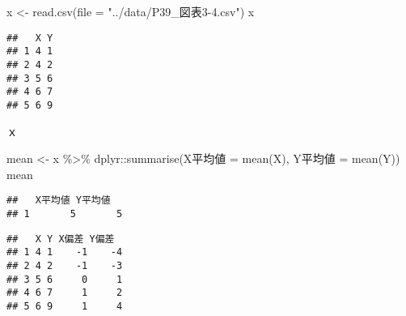 \documentclass[
  12pt,
]{book}
\newenvironment{Shaded}{\begin{snugshade}}{\end{snugshade}}
\newcommand{\AttributeTok}[1]{\textcolor[rgb]{0.77,0.63,0.00}{#1}}
\newcommand{\FunctionTok}[1]{\textcolor[rgb]{0.00,0.00,0.00}{#1}}
\newcommand{\NormalTok}[1]{#1}
\newcommand{\OtherTok}[1]{\textcolor[rgb]{0.56,0.35,0.01}{#1}}
\newcommand{\SpecialCharTok}[1]{\textcolor[rgb]{0.00,0.00,0.00}{#1}}
\newcommand{\StringTok}[1]{\textcolor[rgb]{0.31,0.60,0.02}{#1}}
\begin{document}
\begin{Shaded}
\begin{Highlighting}[]
\NormalTok{x }\OtherTok{\textless{}{-}} \FunctionTok{read.csv}\NormalTok{(}\AttributeTok{file =} \StringTok{"../data/P39\_図表3{-}4.csv"}\NormalTok{) }
\NormalTok{x}
\end{Highlighting}
\end{Shaded}

\begin{verbatim}
##   X Y
## 1 4 1
## 2 4 2
## 3 5 6
## 4 6 7
## 5 6 9
\end{verbatim}

ｘ

\begin{Shaded}
\begin{Highlighting}[]
\NormalTok{mean }\OtherTok{\textless{}{-}}\NormalTok{ x }\SpecialCharTok{\%\textgreater{}\%} 
\NormalTok{  dplyr}\SpecialCharTok{::}\FunctionTok{summarise}\NormalTok{(}\StringTok{\textasciigrave{}}\AttributeTok{X平均値}\StringTok{\textasciigrave{}} \OtherTok{=} \FunctionTok{mean}\NormalTok{(X), }\StringTok{\textasciigrave{}}\AttributeTok{Y平均値}\StringTok{\textasciigrave{}} \OtherTok{=} \FunctionTok{mean}\NormalTok{(Y))}
\NormalTok{mean}
\end{Highlighting}
\end{Shaded}

\begin{verbatim}
##   X平均値 Y平均値
## 1       5       5
\end{verbatim}

\begin{Shaded}
\end{Shaded}

\begin{verbatim}
##   X Y X偏差 Y偏差
## 1 4 1    -1    -4
## 2 4 2    -1    -3
## 3 5 6     0     1
## 4 6 7     1     2
## 5 6 9     1     4
\end{verbatim}
\end{document}
